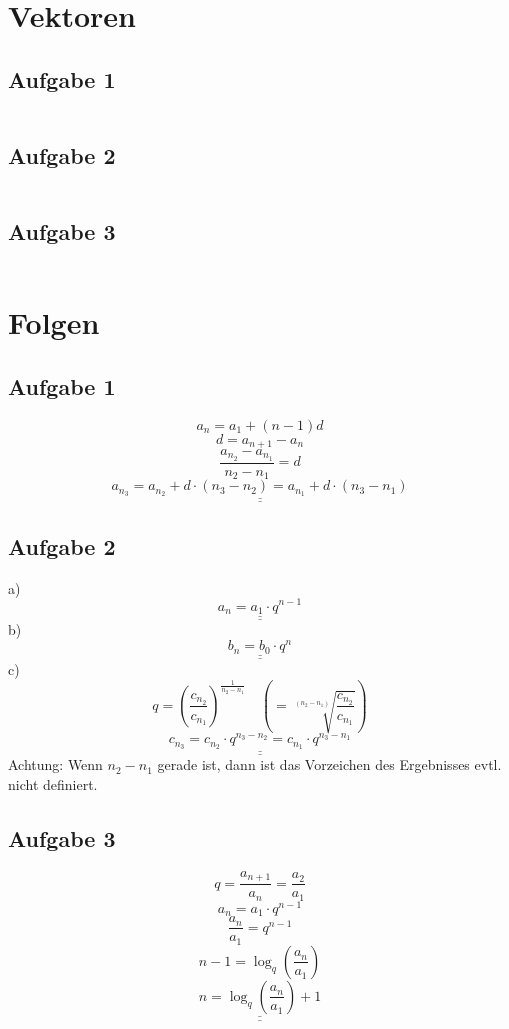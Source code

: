 \section{Vektoren}
\subsection{Aufgabe 1}
\[  \]
\[  \]
\[  \]

\subsection{Aufgabe 2}
\[  \]
\[  \]
\[  \]

\subsection{Aufgabe 3}
\[  \]
\[  \]
\[  \]

\section{Folgen}
\subsection{Aufgabe 1}
\[ a_n = a_1 + (n - 1)d \]
\[ d = a_{n+1} - a_n \]
\[ \frac{a_{n_2} - a_{n_1}}{n_2 - n_1} = d  \]
\[ \underline{\underline{a_{n_3} = a_{n_2} + d \cdot (n_3 - n_2) = a_{n_1} + d \cdot (n_3 - n_1)}} \]

\subsection{Aufgabe 2}
a)
\[ \underline{\underline{a_n = a_1 \cdot q^{n-1}}} \]
b)
\[ \underline{\underline{b_n = b_0 \cdot q^{n}}} \]
c)
\[ q = \left(\frac{c_{n_2}}{c_{n_1}}\right)^{\frac{1}{n_2 - n_1}} \quad\left( = \sqrt[(n_2 - n_1)]{\frac{c_{n_2}}{c_{n_1}}}\right) \]
\[ \underline{\underline{c_{n_3} = c_{n_2} \cdot q^{n_3 - n_2} = c_{n_1} \cdot q^{n_3 - n_1}}} \]
Achtung: Wenn $n_2 - n_1$ gerade ist, dann ist das Vorzeichen des Ergebnisses evtl. nicht definiert. 

\subsection{Aufgabe 3}
\[ q = \frac{a_{n+1}}{a_n} = \frac{a_2}{a_1} \]
\[ a_n = a_1 \cdot q^{n - 1} \]
\[ \frac{a_n}{a_1} = q^{n - 1} \]
\[ n - 1 = \log_q \left(\frac{a_n}{a_1}\right) \]
\[ \underline{\underline{n = \log_q \left(\frac{a_n}{a_1}\right) + 1}}\]

